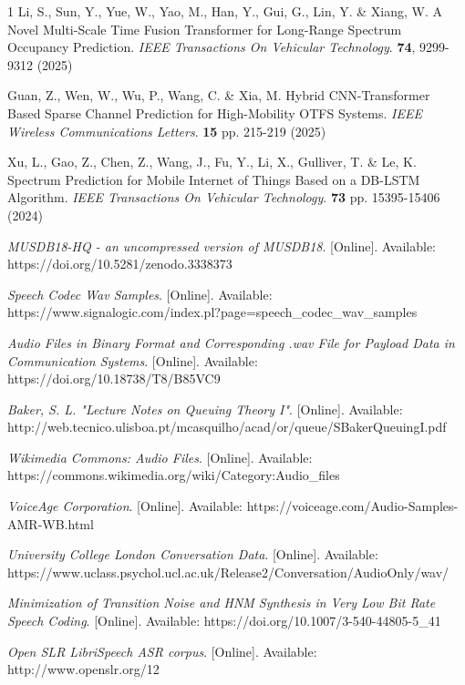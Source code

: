 \documentclass[lettersize,journal]{IEEEtran}
\begin{document}
\begin{thebibliography}{1}
Li, S., Sun, Y., Yue, W., Yao, M., Han, Y., Gui, G., Lin, Y. \& Xiang, W. A Novel Multi-Scale Time Fusion Transformer for Long-Range Spectrum Occupancy Prediction. {\em IEEE Transactions On Vehicular Technology}. \textbf{74}, 9299-9312 (2025)

Guan, Z., Wen, W., Wu, P., Wang, C. \& Xia, M. Hybrid CNN-Transformer Based Sparse Channel Prediction for High-Mobility OTFS Systems. {\em IEEE Wireless Communications Letters}. \textbf{15} pp. 215-219 (2025)

Xu, L., Gao, Z., Chen, Z., Wang, J., Fu, Y., Li, X., Gulliver, T. \& Le, K. Spectrum Prediction for Mobile Internet of Things Based on a DB-LSTM Algorithm. {\em IEEE Transactions On Vehicular Technology}. \textbf{73} pp. 15395-15406 (2024)




{\it{MUSDB18-HQ - an uncompressed version of MUSDB18}}. [Online]. Available: https://doi.org/10.5281/zenodo.3338373

{\it{Speech Codec Wav Samples}}. [Online]. Available: https://www.signalogic.com/index.pl?page=speech\_codec\_wav\_samples

{\it{Audio Files in Binary Format and Corresponding .wav File for Payload Data in Communication Systems}}. [Online]. Available: https://doi.org/10.18738/T8/B85VC9

{\it{Baker, S. L. "Lecture Notes on Queuing Theory I"}}. [Online]. Available: http://web.tecnico.ulisboa.pt/mcasquilho/acad/or/queue/SBakerQueuingI.pdf

{\it{Wikimedia Commons: Audio Files}}. [Online]. Available: https://commons.wikimedia.org/wiki/Category:Audio\_files 

{\it{VoiceAge Corporation}}. [Online]. Available: https://voiceage.com/Audio-Samples-AMR-WB.html

{\it{University College London Conversation Data}}. [Online]. Available: https://www.uclass.psychol.ucl.ac.uk/Release2/Conversation/AudioOnly/wav/

{\it{Minimization of Transition Noise and HNM Synthesis in Very Low Bit Rate Speech Coding}}. [Online]. Available: https://doi.org/10.1007/3-540-44805-5\_41

{\it{Open SLR LibriSpeech ASR corpus}}. [Online]. Available: http://www.openslr.org/12


\end{thebibliography}
\end{document}

